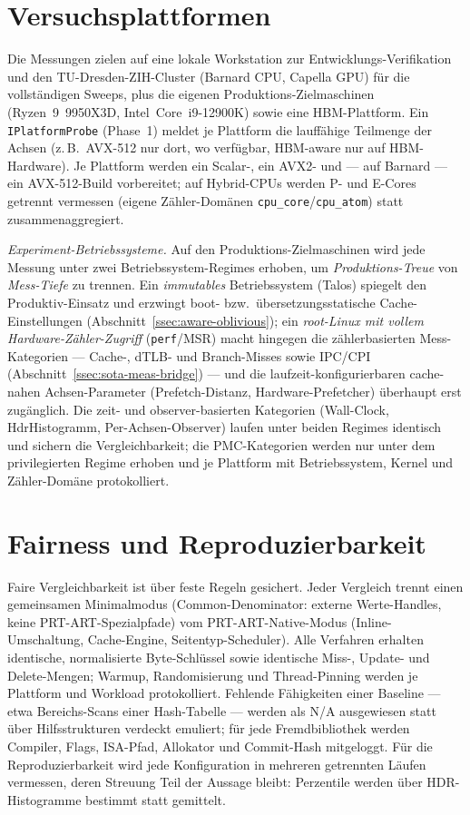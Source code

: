 \section{Versuchsplattformen}\label{sec:platforms}

Die Messungen zielen auf eine lokale Workstation zur Entwicklungs-Verifikation und den
TU-Dresden-ZIH-Cluster (Barnard CPU, Capella GPU) für die vollständigen Sweeps, plus die
eigenen Produktions-Zielmaschinen (Ryzen~9~9950X3D, Intel~Core~i9-12900K) sowie eine HBM-Plattform. Ein %
\texttt{IPlatformProbe} (Phase~1) meldet je Plattform die lauffähige Teilmenge der Achsen
(z.\,B.\ AVX-512 nur dort, wo verfügbar, HBM-aware nur auf HBM-Hardware). Je Plattform werden ein
Scalar-, ein AVX2- und --- auf Barnard --- ein AVX-512-Build vorbereitet; auf Hybrid-CPUs werden P-
und E-Cores getrennt vermessen (eigene Zähler-Domänen \texttt{cpu\_core}/\texttt{cpu\_atom}) statt
zusammenaggregiert.

\smallskip\noindent\emph{Experiment-Betriebssysteme.} Auf den Produktions-Zielmaschinen wird jede Messung
unter zwei Betriebssystem-Regimes erhoben, um \emph{Produktions-Treue} von \emph{Mess-Tiefe} zu
trennen. Ein \emph{immutables} Betriebssystem (Talos) spiegelt den Produktiv-Einsatz und erzwingt
boot- bzw.\ übersetzungsstatische Cache-Einstellungen (Abschnitt~\ref{ssec:aware-oblivious}); ein
\emph{root-Linux mit vollem Hardware-Zähler-Zugriff} (\texttt{perf}/MSR) macht hingegen die
zählerbasierten Mess-Kategorien --- Cache-, dTLB- und Branch-Misses sowie IPC/CPI
(Abschnitt~\ref{ssec:sota-meas-bridge}) --- und die laufzeit-konfigurierbaren cache-nahen
Achsen-Parameter (Prefetch-Distanz, Hardware-Prefetcher) überhaupt erst zugänglich. Die zeit- und
observer-basierten Kategorien (Wall-Clock, HdrHistogramm, Per-Achsen-Observer) laufen unter beiden
Regimes identisch und sichern die Vergleichbarkeit; die PMC-Kategorien werden nur unter dem
privilegierten Regime erhoben und je Plattform mit Betriebssystem, Kernel und Zähler-Domäne
protokolliert.

\section{Fairness und Reproduzierbarkeit}\label{sec:fairness}

Faire Vergleichbarkeit ist über feste Regeln gesichert. Jeder Vergleich trennt einen gemeinsamen
Minimalmodus (Common-Denominator: externe Werte-Handles, keine PRT-ART-Spezialpfade) vom
PRT-ART-Native-Modus (Inline-Umschaltung, Cache-Engine, Seitentyp-Scheduler). Alle Verfahren
erhalten identische, normalisierte Byte-Schlüssel sowie identische Miss-, Update- und Delete-Mengen;
Warmup, Randomisierung und Thread-Pinning werden je Plattform und Workload protokolliert. Fehlende
Fähigkeiten einer Baseline --- etwa Bereichs-Scans einer Hash-Tabelle --- werden als N/A ausgewiesen
statt über Hilfsstrukturen verdeckt emuliert; für jede Fremdbibliothek werden Compiler, Flags,
ISA-Pfad, Allokator und Commit-Hash mitgeloggt. Für die Reproduzierbarkeit wird jede Konfiguration
in mehreren getrennten Läufen vermessen, deren Streuung Teil der Aussage bleibt: Perzentile werden
über HDR-Histogramme bestimmt statt gemittelt.

